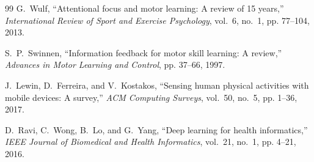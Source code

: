 \documentclass[12pt]{report}
\begin{document}
\begin{thebibliography}{99}
G.~Wulf,
\newblock ``Attentional focus and motor learning: A review of 15 years,''
\newblock \emph{International Review of Sport and Exercise Psychology}, vol.~6, no.~1, pp. 77--104, 2013.

S.~P.~Swinnen,
\newblock ``Information feedback for motor skill learning: A review,''
\newblock \emph{Advances in Motor Learning and Control}, pp. 37--66, 1997.

J.~Lewin, D.~Ferreira, and V.~Kostakos,
\newblock ``Sensing human physical activities with mobile devices: A survey,''
\newblock \emph{ACM Computing Surveys}, vol.~50, no.~5, pp. 1--36, 2017.

D.~Ravi, C.~Wong, B.~Lo, and G.~Yang,
\newblock ``Deep learning for health informatics,''
\newblock \emph{IEEE Journal of Biomedical and Health Informatics}, vol.~21, no.~1, pp. 4--21, 2016.

\end{thebibliography}
\end{document}
